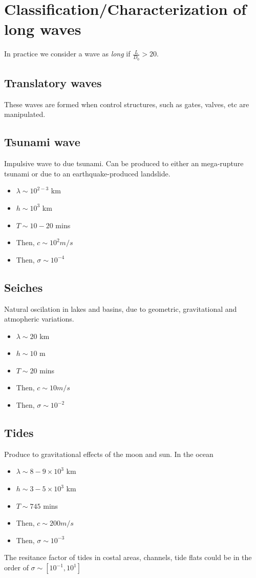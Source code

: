 \documentclass[a4paper, 11pt,article,oneside]{memoir}%
\begin{document}
\section{Classification/Characterization of long waves}
In practice we consider a wave as \textit{long} if $\frac{L}{D_0}> 20$.
{\color{magenta}\subsection{Translatory waves}}
These waves are formed when control structures, such as gates, valves, etc are manipulated.

{\color{magenta}\subsection{Tsunami wave}}
Impulsive wave to due tsunami. Can be produced to either  an mega-rupture tsunami or due to an earthquake-produced landslide. 
\begin{itemize}
\item $\lambda \sim  10^{2-3}$ km
\item $h\sim 10^{3}$ km
\item $T\sim 10-20 $ mins
\item Then, $c\sim 10^2 m/ s $
\item Then, $\sigma\sim 10^{-4}$
\end{itemize}

{\color{magenta}\subsection{Seiches}}
Natural oscilation in lakes and basins, due to geometric, gravitational and atmopheric variations. 
\begin{itemize}
\item $\lambda \sim  20$ km
\item $h\sim 10$ m
\item $T\sim 20 $ mins
\item Then, $c\sim 10 m/s$
\item Then, $\sigma\sim 10^{-2}$
\end{itemize}

{\color{magenta}\subsection{Tides}}
Produce to gravitational effects of the moon and sun.
In the ocean
\begin{itemize}
\item $\lambda \sim  8-9 \times 10^3$ km
\item $h\sim 3-5 \times 10^3$ km
\item $T\sim 745 $ mins
\item Then, $c\sim 200 m/s$
\item Then, $\sigma\sim 10^{-3}$
\end{itemize}
The resitance factor of tides in costal areas, channels, tide flats could be in the order of $\sigma\sim [10^{-1},10^{1}]$ 
\end{document}
